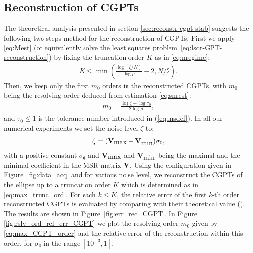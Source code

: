 \subsection{Reconstruction of CGPTs}\label{sec:reconstruction-cgpt}
The theoretical analysis presented in section
\ref{sec:reconstr-cgpt-stab} suggests the following two steps
method for the reconstruction of CGPTs. First we apply
\eqref{eq:Mest} (or equivalently solve the least squares
problem~\eqref{eq:lsqr-GPT-reconstruction}) by fixing the truncation order $K$ as in
\eqref{eq:nregime}:
\begin{align}
  K \leq \min\left ( \frac{\log(\zeta/N)}{\log\rho}-2, N/2\right
  ).
  \label{eq:max_trunc_ord}
\end{align}
Then, we keep  only the first $m_0$ orders in the reconstructed
CGPTs, with $m_0$ being the resolving order deduced from
estimation \eqref{eq:snrest}:
\begin{align}
  m_0 =
  \frac{\log\zeta - \log \tau_0}{2\log\rho}, \label{eq:max_CGPT_order}
\end{align}
and $\tau_0\leq 1$ is the tolerance number introduced in
(\ref{eq:msdef}). In all our numerical experiments we set the
noise level $\zeta$ to:
\begin{align}
  \label{eq:noise_model}
  \zeta = (\mathbf{V}_{\mbox{max}} -
  \mathbf{V}_{\mbox{min}})\sigma_0,
\end{align}
with a positive constant $\sigma_0$ and $\mathbf{V}_{\mbox{max}}$ and
$\mathbf{V}_{\mbox{min}}$ being the maximal and the minimal coefficient in
the MSR matrix $\mathbf{V}$. Using the configuration given in
Figure~\ref{fig:data_acq} and for various noise level, we
reconstruct the CGPTs of the ellipse up to a truncation order $K$
which is determined as in \eqref{eq:max_trunc_ord}. For each $k
\leq K$, the relative error of the first $k$-th order
reconstructed CGPTs is evaluated by comparing with their
theoretical value (\cite[Proposition
4.7]{ammari2007polarization}). The results are shown in
Figure~\ref{fig:err_rec_CGPT}. In Figure
\ref{fig:rslv_ord_rel_err_CGPT} we plot the resolving order $m_0$
given by \eqref{eq:max_CGPT_order} and the relative error of the
reconstruction within this order, for $\sigma_0$ in the range
$[10^{-3}, 1]$.


